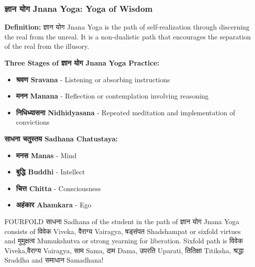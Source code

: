\begin{frame}[fragile]\frametitle{ज्ञान योग  Jnana Yoga: Yoga of Wisdom}
    \textbf{Definition:} ज्ञान योग  Jnana Yoga is the path of self-realization through discerning the real from the unreal. It is a non-dualistic path that encourages the separation of the real from the illusory.

    
    \textbf{Three Stages of ज्ञान योग  Jnana Yoga Practice:}
    \begin{itemize}
        \item \textbf{श्रवण Sravana} - Listening or absorbing instructions
        \item \textbf{मनन Manana} - Reflection or contemplation involving reasoning
        \item \textbf{निधिध्यासना  Nidhidyasana} - Repeated meditation and implementation of convictions
    \end{itemize}

    \textbf{साधना चतुस्तय Sadhana Chatustaya:}
    \begin{itemize}
        \item \textbf{मनस Manas} - Mind
        \item \textbf{बुद्धि Buddhi} - Intellect
        \item \textbf{चित्त Chitta} - Consciousness
        \item \textbf{अहंकार Ahamkara} - Ego
    \end{itemize}
	
FOURFOLD साधना Sadhana of the student in the path of ज्ञान योग   Jnana Yoga consists of विवेक  Viveka, वैराग्य  Vairagya, षड्संपत  Shadshampat or sixfold virtues and मुमुक्षत्व   Mumukshutva or strong yearning for liberation. Sixfold path is विवेक  Viveka,वैराग्य  Vairagya, साम  Sama, दाम  Dama, उपरति  Uparati, तितिक्षा Titiksha, श्रद्धा Sraddha and समाधान Samadhana!
	
\end{frame}


